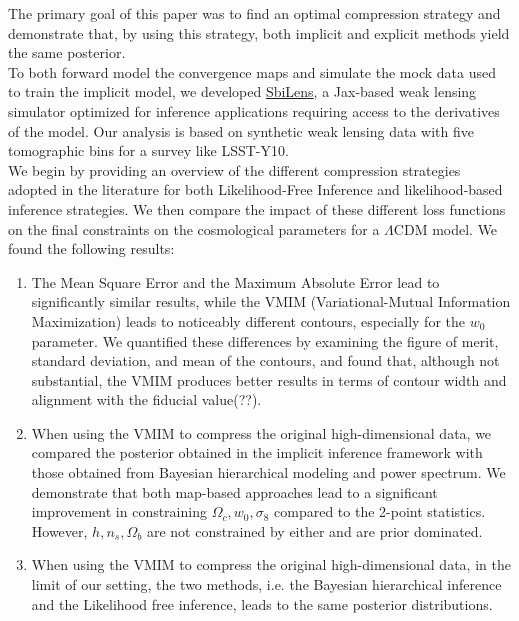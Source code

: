 \documentclass{aa}
\begin{document}
 The primary goal of this paper was to find an optimal compression strategy and demonstrate that, by using this strategy, both implicit and explicit methods yield the same posterior. \\
To both forward model the convergence maps and simulate the mock data used to train the implicit model, we developed \href{https://github.com/DifferentiableUniverseInitiative/sbi_lens}{\url{SbiLens}}, a Jax-based weak lensing simulator optimized for inference applications requiring access to the derivatives of the model. Our analysis is based on synthetic weak lensing data with five tomographic bins for a survey like LSST-Y10. \\
We begin by providing an overview of the different compression strategies adopted in the literature for both Likelihood-Free Inference and likelihood-based inference strategies. We then compare the impact of these different loss functions on the final constraints on the cosmological parameters for a $\Lambda$CDM model. 
We found the following results:
\begin{enumerate}
    \item The Mean Square Error and the Maximum Absolute Error lead to significantly similar results, while the VMIM (Variational-Mutual Information Maximization) leads to noticeably different contours, especially for the $w_0$ parameter. We quantified these differences by examining the figure of merit, standard deviation, and mean of the contours, and found that, although not substantial, the VMIM produces better results in terms of contour width and alignment with the fiducial value(??).
    \item  When using the VMIM to compress the original high-dimensional data, we compared the posterior obtained in the implicit inference framework with those obtained from Bayesian hierarchical modeling and power spectrum. We demonstrate that both map-based approaches lead to a significant improvement in constraining $\Omega_c, w_0, \sigma_8$ compared to the 2-point statistics. However, $h, n_s,\Omega_b$ are not constrained by either and are prior dominated.
    \item   When using the VMIM to compress the original high-dimensional data,  in the limit of our setting, the two methods, i.e. the Bayesian hierarchical inference and the Likelihood free inference, leads to the same posterior distributions.  
\end{enumerate}
\end{document}

